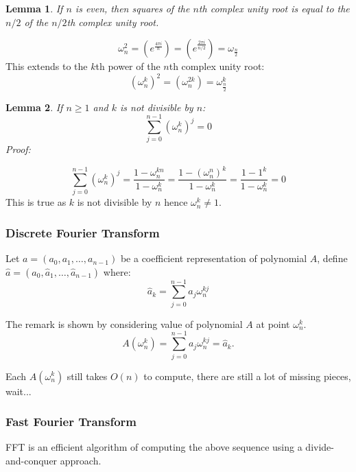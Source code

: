 \documentclass[10pt]{article}
\newtheorem{lemma}{Lemma}
\begin{document}
\begin{lemma}\label{halving-lemma}
    If $n$ is even, then squares of the $n$th complex unity root is equal to
    the $n/2$ of the $n/2$th complex unity root.
\end{lemma}
$$
\omega^2_{n} = (e^{\frac{4\pi i}{n}}) = (e^{\frac{2\pi i}{n/2}}) = \omega_{\frac{n}{2}}
$$
This extends to the $k$th power of the $n$th complex unity root:
$$
(\omega^k_{n})^2 = (\omega^{2k}_{n}) = \omega^{k}_{\frac{n}{2}}
$$
\begin{lemma}\label{summation-lemma}
    If $n \geq 1$ and $k$ is not divisible by $n$:
    $$
    \sum_{j=0}^{n-1}(\omega^{k}_n)^j = 0
    $$
Proof:
\end{lemma}
\[
    \sum_{j=0}^{n-1}(\omega^{k}_n)^j = \frac{1 - \omega^{kn}_n}{1 -\omega^{k}_n}
    = \frac{1 - (\omega^{n}_n)^k}{1 -\omega^{k}_n}
    = \frac{1 - 1^k}{1 -\omega^{k}_n}
    = 0
\]
This is true as $k$ is not divisible by $n$ hence $\omega^{k}_n \neq 1$.

\subsubsection{Discrete Fourier Transform}
Let $a = (a_0, a_1, \ldots, a_{n-1})$ be a coefficient representation of
polynomial $A$, define $\hat{a} = (\hat{a}_0, \hat{a}_1, \ldots,
\hat{a}_{n-1})$ where:
\[
    \hat{a}_k = \sum^{n-1}_{j=0}{a_j\omega^{kj}_n} 
\]

The remark is shown by considering value of polynomial $A$ at point
$\omega^k_n$.
\[
    A(\omega^k_n) = \sum^{n-1}_{j=0}{a_j\omega^{kj}_n} = \hat{a}_k.
\]

Each $A(\omega^k_n)$ still takes $O(n)$ to compute, there are still a lot of missing pieces, wait...

\subsubsection{Fast Fourier Transform}
FFT is an efficient algorithm of computing the above sequence using a
divide-and-conquer approach.
\end{document}
